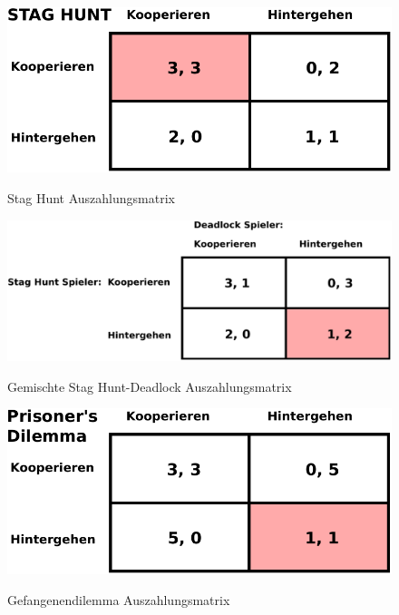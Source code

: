 \documentclass[12pt,a4paper,listof=totoc,oneside]{scrreprt}
\begin{document}
\begin{figure}%
\centering
\caption{Stag Hunt Auszahlungsmatrix}
\includegraphics[scale=0.8]{Grafiken/Stag_Hunt_Ink.pdf} 
\label{pic:StagHunt}
\end{figure}

\begin{figure}%
\centering
\caption{Gemischte Stag Hunt-Deadlock Auszahlungsmatrix}
\includegraphics[scale=0.7]{Grafiken/Mixed_Ink.pdf} 
\label{pic:Mixed}
\end{figure}

\begin{figure}%
\centering
\caption{Gefangenendilemma Auszahlungsmatrix}
\includegraphics[scale=0.8]{Grafiken/Prisoner_Ink.pdf} 
\label{pic:Prisoner}
\end{figure}
\end{document}
